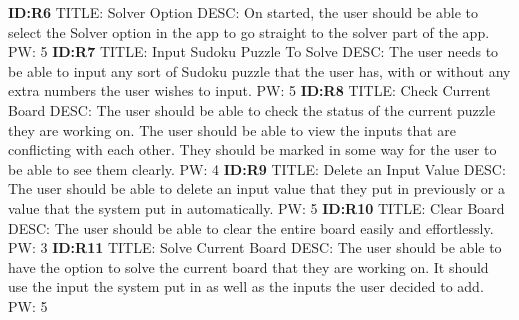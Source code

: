 \documentclass{article}
\begin{document}
\textbf{ID:R6} \newline TITLE: Solver Option \newline DESC: On started, the user should be able to select the Solver option in the app to go straight to the solver part of the app. \newline PW: 5 \newline \newline
\textbf{ID:R7} \newline TITLE: Input Sudoku Puzzle To Solve \newline DESC: The user needs to be able to input any sort of Sudoku puzzle that the user has, with or without any extra numbers the user wishes to input. \newline PW: 5 \newline \newline
\textbf{ID:R8} \newline TITLE: Check Current Board \newline DESC: The user should be able to check the status of the current puzzle they are working on. The user should be able to view the inputs that are conflicting with each other. They should be marked in some way for the user to be able to see them clearly. \newline PW: 4 \newline \newline
\textbf{ID:R9} \newline TITLE: Delete an Input Value \newline DESC: The user should be able to delete an input value that they put in previously or a value that the system put in automatically. \newline PW: 5 \newline \newline
\textbf{ID:R10} \newline TITLE: Clear Board \newline DESC: The user should be able to clear the entire board easily and effortlessly. \newline PW: 3 \newline \newline
\textbf{ID:R11} \newline TITLE: Solve Current Board \newline DESC: The user should be able to have the option to solve the current board that they are working on. It should use the input the system put in as well as the inputs the user decided to add. \newline PW: 5 \newline \newline
\end{document}
